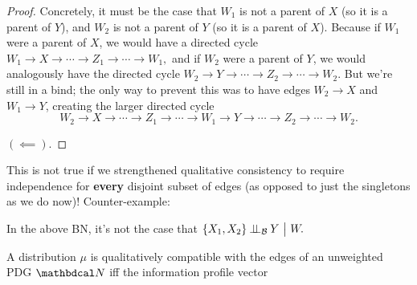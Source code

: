 \documentclass{article}
\newcommand{\CI}{\mathbin{\bot\!\!\!\bot}}
\begin{document}
\begin{proof}
        Concretely, it must be the case that $W_1$ is not a parent of $X$ (so it is a parent of $Y$), and $W_2$ is not a parent of $Y$ (so it is a parent of $X$). 
        Because if $W_1$ were a parent of $X$, we would have a directed cycle 
        $W_1 \to X \to\cdots\to Z_1 \to \cdots \to W_1,$ 
        and if $W_2$ were a parent of $Y$, we would analogously have the directed cycle 
        $W_2 \to Y \to\cdots\to Z_2 \to \cdots\to W_2$. 
        But we're still in a bind; the only way to prevent this was to have edges $W_2 \to X$ and $W_1 \to Y$, creating the larger directed cycle
        \[
            W_2 \to X \to\!\cdots\!\to Z_1 \to\!\cdots\!\to W_1 \to Y \to\!\cdots\!\to Z_2 \to\!\cdots\!\to W_2.
        \]
        

        
                
        $(\impliedby)$.
    \end{proof}
    \begin{remark}
        This is not true if we strengthened qualitative consistency to require independence for \textbf{every} disjoint subset of edges (as opposed to just the singletons as we do now)! Counter-example:
        \begin{center}
        \end{center}
        In the above BN, it's not the case that
        \(
            \{X_1, X_2\} \CI_{\cal B} Y ~\big|~ W.
        \)
    \end{remark}
    
    
    \begin{claim}
        A distribution $\mu$ is qualitatively compatible with the edges of an unweighted PDG $\dg N$ iff 
        the information profile vector
    \end{claim}
    
\end{document}
